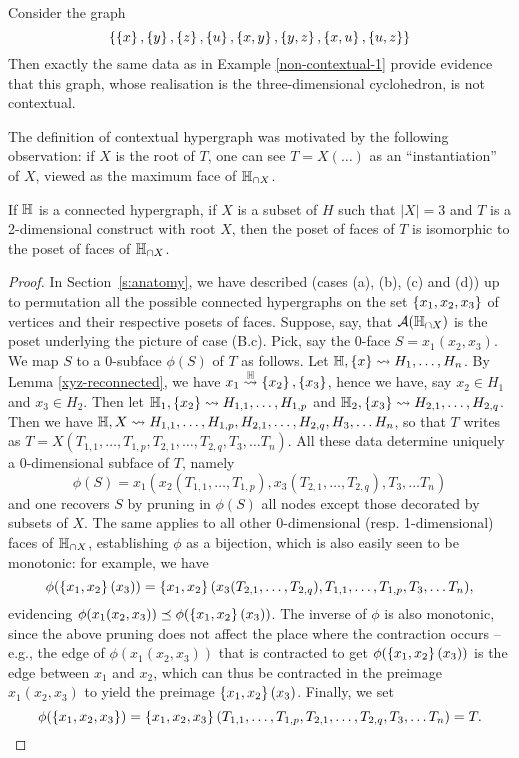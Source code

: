 \begin{example} \label{non-contextual-2}
Consider the graph 
$$\left\{\left\{x\right\},\left\{y\right\},\left\{z\right\},\left\{u\right\},\left\{x,y\right\}, \left\{y,z\right\}, \left\{x,u\right\}, \left\{u,z\right\}\right\}$$
Then exactly the same data as in Example \ref{non-contextual-1} provide evidence that this graph, whose realisation is the three-dimensional cyclohedron, is not contextual. 
\end{example}

The definition of contextual hypergraph was motivated by the following observation: if $X$ is the root of $T$, one can see $T=X(\ldots)$ as an ``instantiation'' of $X$, viewed as the maximum face of ${\mathbb H}_{\cap X}$.

\begin{lemma} \label{instance-construct} 
 If ${\mathbb H}$ is a connected hypergraph, if $X$ is a subset of $H$ such that $|X|=3$ and $T$ is a 2-dimensional construct with root $X$, then the poset of faces of $T$ is isomorphic to the poset of faces of ${\mathbb H}_{\cap X}$.
\end{lemma}

\begin{proof}
In Section~\ref{s:anatomy}, we have described (cases (a), (b), (c) and (d)) up to permutation all the possible connected hypergraphs on the set $\left\{x_1,x_2,x_3\right\}$ of vertices and their respective posets of faces. Suppose, say, that
 ${\cal A}({\mathbb H}_{\cap X})$ is the poset underlying the picture of case (B.c). Pick, say the 0-face $S= x_1(x_2,x_3)$. We map $S$ to a 0-subface $\phi(S)$ of $T$ as follows. Let ${\mathbb H},\left\{x\right\}\leadsto H_1,\ldots,H_n$. By Lemma \ref{xyz-reconnected}, we have $x_1\stackrel{{\mathbb H}}{\rightsquigarrow}\left\{x_2\right\},\left\{x_3\right\}$, hence we have, say $x_2\in H_1$ and $x_3\in H_2$. Then let
 ${\mathbb H_1},\left\{x_2\right\}\leadsto H_{1,1},\ldots,H_{1,p}$ and ${\mathbb H_2},\left\{x_3\right\}\leadsto H_{2,1},\ldots,H_{2,q}$.
 Then we have ${\mathbb H},X\leadsto H_{1,1},\ldots,H_{1,p},H_{2,1},\ldots,H_{2,q},H_3,\ldots H_n$, so that $T$ writes as
 $T= X(T_{1,1},\ldots,T_{1,p},T_{2,1},\ldots,T_{2,q},T_3,\ldots T_n)$. All these data determine uniquely a 0-dimensional subface of $T$, namely
 $$\phi(S)=x_1(x_2(T_{1,1},\ldots,T_{1,p}),x_3(T_{2,1},\ldots,T_{2,q}),T_3,\ldots T_n)$$
and one recovers $S$
 by  pruning in $\phi(S)$ all nodes except those decorated by subsets of $X$.
 The same applies to all other 0-dimensional (resp. 1-dimensional) faces of ${\mathbb H}_{\cap X}$, establishing $\phi$ as a bijection, which is also easily seen to be monotonic: for example, we have
$$\phi(\left\{x_1,x_2\right\}(x_3))= \left\{x_1,x_2\right\}(x_3(T_{2,1},\ldots,T_{2,q}),T_{1,1},\ldots,T_{1,p},T_3,\ldots T_n),$$
evidencing $\phi(x_1(x_2,x_3))\preceq \phi(\left\{x_1,x_2\right\}(x_3))$. 
The inverse of $\phi$ is also monotonic, since the above pruning does not affect the place where the contraction occurs -- e.g., the edge of $\phi(x_1(x_2,x_3))$ that is contracted to get $\phi(\left\{x_1,x_2\right\}(x_3))$ is the edge between $x_1$ and $x_2$, which can thus be contracted in the preimage $x_1(x_2,x_3)$ to yield the preimage $\left\{x_1,x_2\right\}(x_3)$.
Finally, we set
$$\phi(\left\{x_1,x_2,x_3\right\})=\left\{x_1,x_2,x_3\right\}(T_{1,1},\ldots,T_{1,p},T_{2,1},\ldots,T_{2,q},T_3,\ldots T_n)=T.$$
\end{proof}

